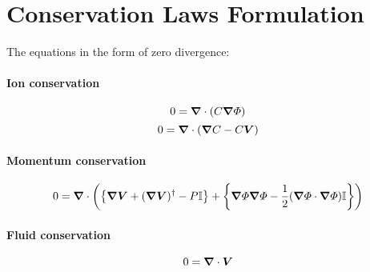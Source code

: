 \section{Conservation Laws Formulation}
The equations in the form of zero divergence:

\paragraph{Ion conservation}
\[ 0 = \boldsymbol{\nabla} \cdot \left( C \boldsymbol{\nabla} \varPhi \right) \]
\[ 0 = \boldsymbol{\nabla} \cdot \left( \boldsymbol{\nabla} C - C \boldsymbol{V} \right) \]

\paragraph{Momentum conservation}
\[ 0 = \boldsymbol{\nabla} \cdot \left(
\left\{ \boldsymbol{\nabla} \boldsymbol{V} + (\boldsymbol{\nabla} \boldsymbol{V})^\dagger - P\mathbb{I} \right\} +
\left\{ \boldsymbol{\nabla} \varPhi \boldsymbol{\nabla} \varPhi - \frac{1}{2} (\boldsymbol{\nabla} \varPhi \cdot \boldsymbol{\nabla} \varPhi) \mathbb{I} \right\} \right) \]

\paragraph{Fluid conservation}
\[ 0 = \boldsymbol{\nabla} \cdot \boldsymbol{V} \]

